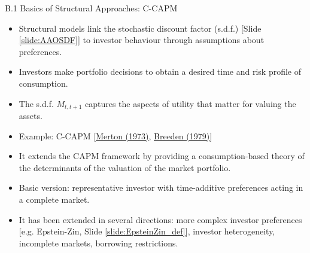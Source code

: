 \begin{frame}{}
\begin{large}
\begin{center}
B.1 Basics of Structural Approaches: C-CAPM
\end{center}
\end{large}
\end{frame}


\begin{frame}
\begin{footnotesize}
\begin{itemize}
	\item {\color{blue}Structural models} link the stochastic discount factor (s.d.f.) [Slide \ref{slide:AAOSDF}] to investor behaviour through assumptions about preferences.
	\item Investors make portfolio decisions to obtain a desired time and risk profile of consumption.
	\item The s.d.f. $M_{t,t+1}$ captures the aspects of utility that matter for valuing the assets.
	\item Example: C-CAPM [\href{http://www.people.hbs.edu/rmerton/Intertemporal\%20Capital\%20Asset\%20Pricing\%20Model.pdf}{Merton (1973)}, \href{http://www.sciencedirect.com/science/article/pii/0304405X79900163}{Breeden (1979)}]
	
	\item It extends the CAPM framework by providing a consumption-based theory of the determinants of the valuation of the market portfolio.
	
	\item Basic version: representative investor with {\color{blue}time-additive preferences} acting in a complete market.
	
	\item It has been extended in several directions: more complex investor preferences [e.g. Epstein-Zin, Slide \ref{slide:EpsteinZin_def}], investor heterogeneity, incomplete markets, borrowing restrictions.
\end{itemize}
\end{footnotesize}
\end{frame}



